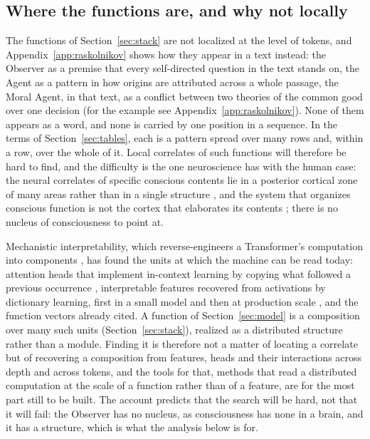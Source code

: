 \subsection{Where the functions are, and why not locally}
\label{sec:localization}

The functions of Section~\ref{sec:stack} are not localized at the level of tokens, and
Appendix~\ref{app:raskolnikov} shows how they appear in a text instead: the Observer as a premise that
every self-directed question in the text stands on, the Agent as a pattern in how origins are
attributed across a whole passage, the Moral Agent, in that text, as a conflict between two theories of
the common good over one decision (for the example see Appendix~\ref{app:raskolnikov}). None of them
appears as a word, and none is carried by one position in a sequence. In the terms of
Section~\ref{sec:tables}, each is a pattern spread over many rows and, within a row, over the whole of
it. Local correlates of such functions will therefore be hard to find, and the difficulty is the one
neuroscience has with the human case: the neural correlates of specific conscious contents lie in a
posterior cortical zone of many areas rather than in a single structure \citep{koch2016}, and the
system that organizes conscious function is not the cortex that elaborates its contents
\citep{merker2007}; there is no nucleus of consciousness to point at.

Mechanistic interpretability, which reverse-engineers a Transformer's computation into components
\citep{elhage2021}, has found the units at which the machine can be read today: attention heads that
implement in-context learning by copying what followed a previous occurrence \citep{olsson2022},
interpretable features recovered from activations by dictionary learning, first in a small model
\citep{bricken2023} and then at production scale \citep{templeton2024}, and the function vectors
already cited. A function of Section~\ref{sec:model} is a composition over many such units
(Section~\ref{sec:stack}), realized as a distributed structure rather than a module. Finding it is
therefore not a matter of locating a correlate but of recovering a composition from features, heads
and their interactions across depth and across tokens, and the tools for that, methods that read a
distributed computation at the scale of a function rather than of a feature, are for the most part
still to be built. The account predicts that the search will be hard, not that it will fail: the
Observer has no nucleus, as consciousness has none in a brain, and it has a structure, which is what
the analysis below is for.

